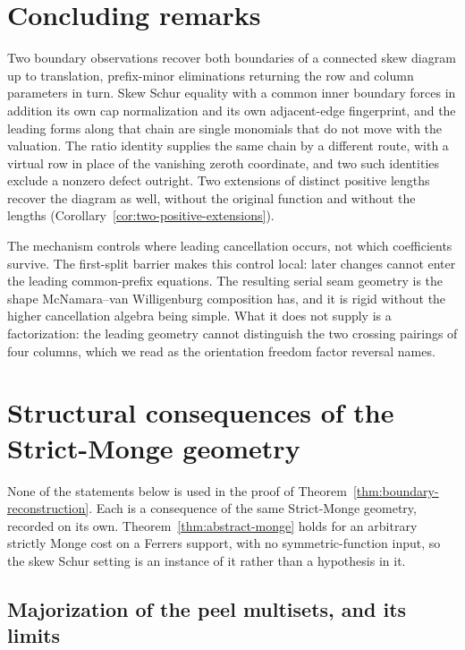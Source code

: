 \documentclass[11pt,a4paper]{amsart}
\numberwithin{equation}{section}
\theoremstyle{plain}
\theoremstyle{definition}
\begin{document}
\section{Concluding remarks}\label{sec:conclusion}

Two boundary observations recover both boundaries of a connected skew diagram
up to translation, prefix-minor eliminations returning the row and column
parameters in turn.  Skew Schur equality with a common inner boundary forces
in addition its own cap normalization and its own adjacent-edge fingerprint,
and the leading forms along that chain are single monomials that do not move
with the valuation.  The ratio
identity supplies the same chain by a different route, with a virtual row
in place of the vanishing zeroth coordinate, and two such identities
exclude a nonzero defect outright.  Two extensions of distinct positive
lengths recover the diagram as well, without the original function and
without the lengths
(Corollary~\ref{cor:two-positive-extensions}).

The mechanism controls where leading cancellation occurs, not which
coefficients survive.  The first-split barrier makes this control local:
later changes cannot enter the leading common-prefix equations.  The
resulting serial seam geometry is the shape McNamara--van Willigenburg
composition has, and it is rigid without the higher cancellation algebra
being simple.  What it does not supply is a factorization: the leading
geometry cannot distinguish the two crossing pairings of four columns,
which we read as the orientation freedom factor reversal names.

\appendix

\section{Structural consequences of the Strict-Monge geometry}\label{app:structural}

None of the statements below is used in the proof of Theorem~\ref{thm:boundary-reconstruction}.  Each is a consequence of the same Strict-Monge geometry, recorded on its own.  Theorem~\ref{thm:abstract-monge} holds for an arbitrary strictly Monge cost on a Ferrers support, with no symmetric-function input, so the skew Schur setting is an instance of it rather than a hypothesis in it.

\subsection{Majorization of the peel multisets, and its limits}\label{subsec:majorization}
\end{document}
